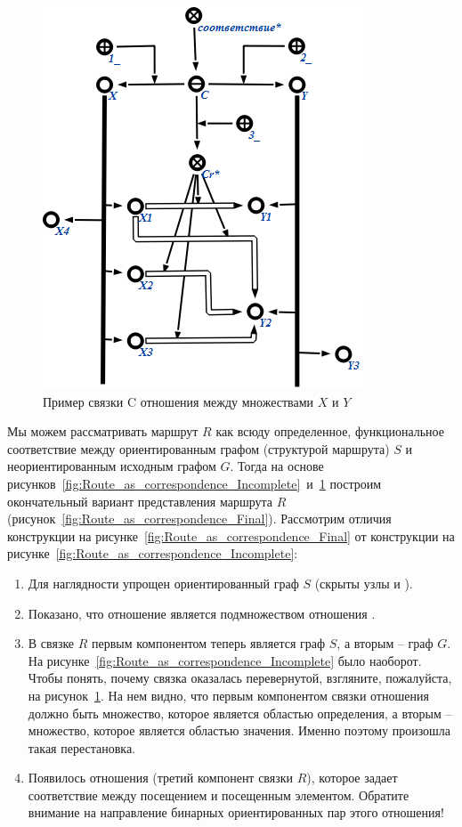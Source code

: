 \begin{figure}[h!]
  \centering
  \includegraphics[scale=0.8]{images/2/Relation_Correspondence_example}
  \caption{Пример связки C отношения  между
    множествами $X$ и $Y$}
  \label{fig:Relation_Correspondence_example}
\end{figure}

Мы можем рассматривать маршрут $R$ как всюду определенное,
функциональное соответствие между ориентированным графом (структурой
маршрута) $S$ и неориентированным исходным графом $G$.  Тогда на
основе
рисунков~\ref{fig:Route_as_correspondence_Incomplete}~и~\ref{fig:Relation_Correspondence_example}
построим окончательный вариант представления маршрута $R$
(рисунок~\ref{fig:Route_as_correspondence_Final}). Рассмотрим отличия
конструкции на рисунке~\ref{fig:Route_as_correspondence_Final} от
конструкции на рисунке~\ref{fig:Route_as_correspondence_Incomplete}:

\begin{enumerate}
\item Для наглядности упрощен ориентированный граф $S$ (скрыты узлы
   и ).
\item Показано, что отношение  является подмножеством
  отношения .
\item В связке $R$ первым компонентом теперь является граф $S$, а
  вторым – граф $G$. На
  рисунке~\ref{fig:Route_as_correspondence_Incomplete} было
  наоборот. Чтобы понять, почему связка оказалась перевернутой,
  взгляните, пожалуйста, на
  рисунок~\ref{fig:Relation_Correspondence_example}. На нем видно, что
  первым компонентом связки отношения  должно быть
  множество, которое является областью определения, а вторым –
  множество, которое является областью значения. Именно поэтому
  произошла такая перестановка.
\item Появилось отношения (третий компонент связки $R$), которое задает
  соответствие между посещением и посещенным элементом. Обратите
  внимание на направление бинарных ориентированных пар этого
  отношения!
\end{enumerate}

